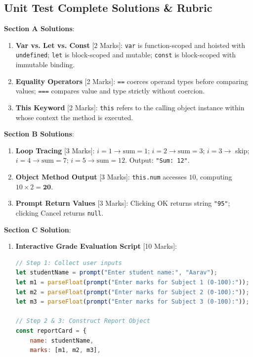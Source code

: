 \subsection{Unit Test Complete Solutions \& Rubric}

\begin{solutionbox}
\noindent\textbf{Section A Solutions}:
\begin{enumerate}
    \item \textbf{Var vs. Let vs. Const} [2 Marks]: \texttt{var} is function-scoped and hoisted with \texttt{undefined}; \texttt{let} is block-scoped and mutable; \texttt{const} is block-scoped with immutable binding.
    \item \textbf{Equality Operators} [2 Marks]: \texttt{==} coerces operand types before comparing values; \texttt{===} compares value and type strictly without coercion.
    \item \textbf{This Keyword} [2 Marks]: \texttt{this} refers to the calling object instance within whose context the method is executed.
\end{enumerate}

\noindent\textbf{Section B Solutions}:
\begin{enumerate}[start=4]
    \item \textbf{Loop Tracing} [3 Marks]: $i=1 \to \text{sum}=1$; $i=2 \to \text{sum}=3$; $i=3 \to$ skip; $i=4 \to \text{sum}=7$; $i=5 \to \text{sum}=12$. Output: \texttt{"Sum: 12"}.
    \item \textbf{Object Method Output} [3 Marks]: \texttt{this.num} accesses $10$, computing $10 \times 2 = \mathbf{20}$.
    \item \textbf{Prompt Return Values} [3 Marks]: Clicking OK returns string \texttt{"95"}; clicking Cancel returns \texttt{null}.
\end{enumerate}

\noindent\textbf{Section C Solution}:
\begin{enumerate}[start=7]
    \item \textbf{Interactive Grade Evaluation Script} [10 Marks]:
\begin{lstlisting}[language=JavaScript]
// Step 1: Collect user inputs
let studentName = prompt("Enter student name:", "Aarav");
let m1 = parseFloat(prompt("Enter marks for Subject 1 (0-100):"));
let m2 = parseFloat(prompt("Enter marks for Subject 2 (0-100):"));
let m3 = parseFloat(prompt("Enter marks for Subject 3 (0-100):"));

// Step 2 & 3: Construct Report Object
const reportCard = {
    name: studentName,
    marks: [m1, m2, m3],
    

\end{lstlisting}
\end{enumerate}
\end{solutionbox}

